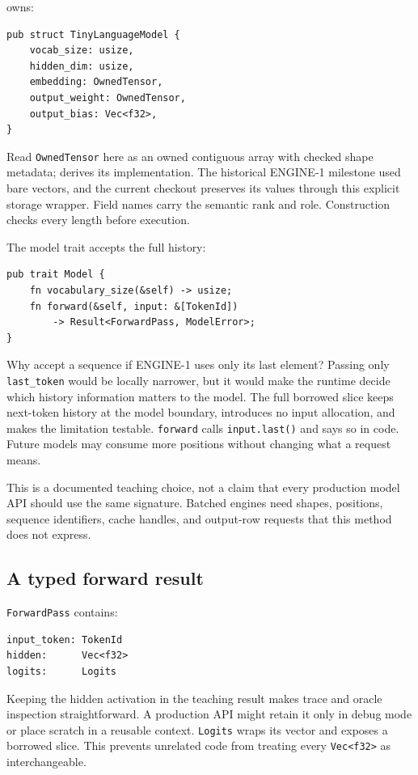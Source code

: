 \texttt{} owns:

\begin{verbatim}
pub struct TinyLanguageModel {
    vocab_size: usize,
    hidden_dim: usize,
    embedding: OwnedTensor,
    output_weight: OwnedTensor,
    output_bias: Vec<f32>,
}
\end{verbatim}

Read \texttt{OwnedTensor} here as an owned contiguous array with checked
shape metadata;  derives its implementation. The historical
ENGINE-1 milestone used bare vectors, and the current checkout preserves
its values through this explicit storage wrapper. Field names carry the
semantic rank and role. Construction checks every length before execution.

The model trait accepts the full history:

\begin{verbatim}
pub trait Model {
    fn vocabulary_size(&self) -> usize;
    fn forward(&self, input: &[TokenId])
        -> Result<ForwardPass, ModelError>;
}
\end{verbatim}

Why accept a sequence if ENGINE-1 uses only its last element? Passing
only \texttt{last\_token} would be locally narrower, but it would make
the runtime decide which history information matters to the model. The
full borrowed slice keeps next-token history at the model boundary,
introduces no input allocation, and makes the limitation testable.
\texttt{forward} calls \texttt{input.last()} and says so in code. Future
models may consume more positions without changing what a request means.

This is a documented teaching choice, not a claim that every production
model API should use the same signature. Batched engines need shapes,
positions, sequence identifiers, cache handles, and output-row requests
that this method does not express.

\subsection{A typed forward result}\label{a-typed-forward-result}

\texttt{ForwardPass} contains:

\begin{verbatim}
input_token: TokenId
hidden:      Vec<f32>
logits:      Logits
\end{verbatim}

Keeping the hidden activation in the teaching result makes trace and
oracle inspection straightforward. A production API might retain it only
in debug mode or place scratch in a reusable context. \texttt{Logits}
wraps its vector and exposes a borrowed slice. This prevents unrelated
code from treating every \texttt{Vec\textless{}f32\textgreater{}} as
interchangeable.

